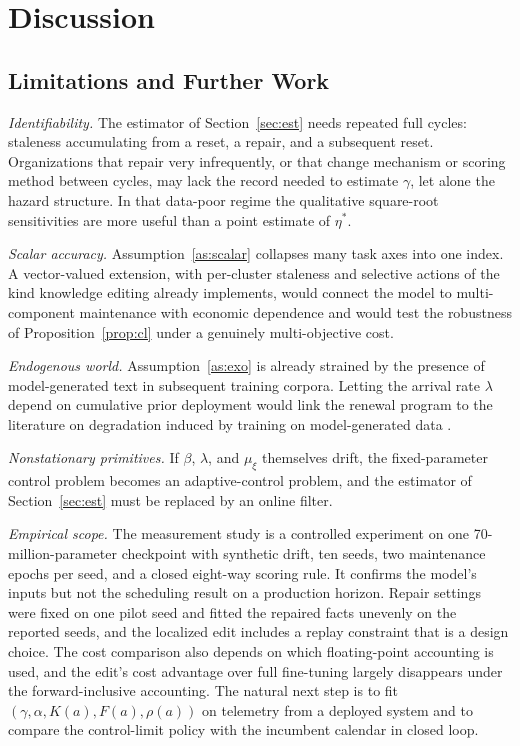 \documentclass[journal]{IEEEtran}
\begin{document}
\section{Discussion}\label{sec:disc}
\subsection{Limitations and Further Work}
\emph{Identifiability.} The estimator of Section~\ref{sec:est} needs repeated full cycles: staleness accumulating from a reset, a repair, and a subsequent reset. Organizations that repair very infrequently, or that change mechanism or scoring method between cycles, may lack the record needed to estimate $\gamma$, let alone the hazard structure. In that data-poor regime the qualitative square-root sensitivities are more useful than a point estimate of $\eta^\ast$.

\emph{Scalar accuracy.} Assumption~\ref{as:scalar} collapses many task axes into one index. A vector-valued extension, with per-cluster staleness and selective actions of the kind knowledge editing already implements, would connect the model to multi-component maintenance with economic dependence \cite{dekker1997} and would test the robustness of Proposition~\ref{prop:cl} under a genuinely multi-objective cost.

\emph{Endogenous world.} Assumption~\ref{as:exo} is already strained by the presence of model-generated text in subsequent training corpora. Letting the arrival rate $\lambda$ depend on cumulative prior deployment would link the renewal program to the literature on degradation induced by training on model-generated data \cite{shumailov2024}.

\emph{Nonstationary primitives.} If $\beta$, $\lambda$, and $\mu_\xi$ themselves drift, the fixed-parameter control problem becomes an adaptive-control problem, and the estimator of Section~\ref{sec:est} must be replaced by an online filter.

\emph{Empirical scope.} The measurement study is a controlled experiment on one 70-million-parameter checkpoint with synthetic drift, ten seeds, two maintenance epochs per seed, and a closed eight-way scoring rule. It confirms the model's inputs but not the scheduling result on a production horizon. Repair settings were fixed on one pilot seed and fitted the repaired facts unevenly on the reported seeds, and the localized edit includes a replay constraint that is a design choice. The cost comparison also depends on which floating-point accounting is used, and the edit's cost advantage over full fine-tuning largely disappears under the forward-inclusive accounting. The natural next step is to fit $(\gamma,\alpha,K(a),F(a),\rho(a))$ on telemetry from a deployed system and to compare the control-limit policy with the incumbent calendar in closed loop.
\end{document}
